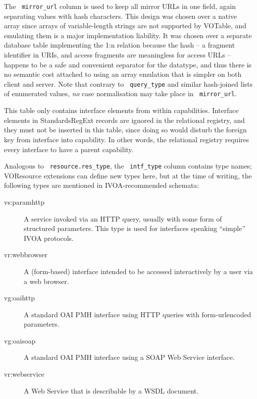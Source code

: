 \documentclass[11pt,a4paper]{ivoa}
\newcommand{\rtent}[1]{\texttt{\color{rtcolor} #1}}
\begin{document}
The \rtent{mirror\_url} column is used to keep all mirror URLs in one
field, again separating values with hash characters.  This design was
chosen over a native array since arrays of variable-length strings are
not supported by VOTable, and emulating them is a major implementation
liability.  It was chosen over a separate database table implementing
the 1:n relation because the hash -- a fragment identifier in URIs, and
access fragments are meaningless for access URLs -- happens to be a safe and
convenient separator for the datatype, and thus there is no semantic
cost attached to using an array emulation that is simpler on both client
and server.  Note that contrary to \rtent{query\_type} and similar
hash-joined lists of enumerated values, \emph{no} case normalisation
may take place in \rtent{mirror\_url}.

This table only contains interface elements from within capabilities.
Interface elements in StandardsRegExt records are ignored in the
relational registry,
and they must not be inserted in this table, since doing so would disturb
the foreign key from interface into capability.  In other words,
the relational registry requires every interface to have a parent capability.

Analogous to \rtent{resource.res\_type}, the
\rtent{intf\_type} column contains type names; VOResource extensions
can define new types here, but at the time of writing, the following
types are mentioned in IVOA-recommended schemata:


\begin{description}
\item[vs:paramhttp]A service invoked via an HTTP query, usually with some form of
structured parameters. This type is used for interfaces speaking
``simple'' IVOA protocols.
\item[vr:webbrowser]A (form-based) interface intended to be accessed interactively by a
user via a web browser.
\item[vg:oaihttp]A standard OAI PMH interface using HTTP queries with form-urlencoded
parameters.
\item[vg:oaisoap]A standard OAI PMH interface using a SOAP Web Service
interface.
\item[vr:webservice]A Web Service that is describable by a WSDL document.

\end{description}


\end{document}
